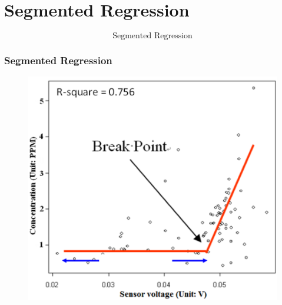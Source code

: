 \documentclass{beamer}
\begin{document}
\section{Segmented Regression}
\begin{frame}
	\LARGE
	\[\mbox{Segmented Regression}\]
\end{frame}
\begin{frame}
		\frametitle{Segmented Regression}
		\large
	\begin{figure}
\centering
\includegraphics[width=0.7\linewidth]{images/breakpoint}
\caption{}
\label{fig:breakpoint}
\end{figure}

\end{frame}

\end{document}

